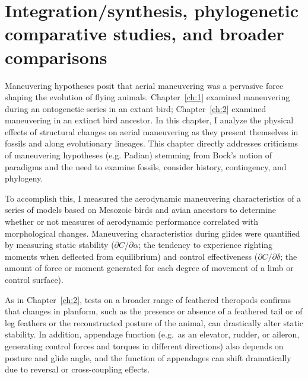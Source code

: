 \section{Integration/synthesis, phylogenetic comparative studies, and broader comparisons}
\label{sec:Comparative}
Maneuvering hypotheses posit that aerial maneuvering was a pervasive force shaping the evolution of flying animals. Chapter~\ref{ch:1} examined maneuvering during an ontogenetic series in an extant bird; Chapter~\ref{ch:2} examined maneuvering in an extinct bird ancestor. In this chapter, I analyze the physical effects of structural changes on aerial maneuvering as they present themselves in fossils and along evolutionary lineages. This chapter directly addresses criticisms of maneuvering hypotheses (e.g. Padian) stemming from Bock's notion of paradigms and the need to examine fossils, consider history, contingency, and phylogeny.  

To accomplish this, I measured the aerodynamic maneuvering characteristics of a series of models based on Mesozoic birds and avian ancestors to determine whether or not measures of aerodynamic performance correlated with morphological changes. Maneuvering characteristics during glides were quantified by measuring static stability ($\partial C/\partial\alpha$; the tendency to experience righting moments when deflected from equilibrium) and control effectiveness ($\partial C/\partial\delta$; the amount of force or moment generated for each degree of movement of a limb or control surface). 

As in Chapter~\ref{ch:2}, tests on a broader range of feathered theropods confirms that changes in planform, such as the presence or absence of a feathered tail or of leg feathers or the reconstructed posture of the animal, can drastically alter static stability. In addition, appendage function (e.g.\ as an elevator, rudder, or aileron, generating control forces and torques in different directions) also depends on posture and glide angle, and the function of appendages can shift dramatically due to reversal or cross-coupling effects. 

